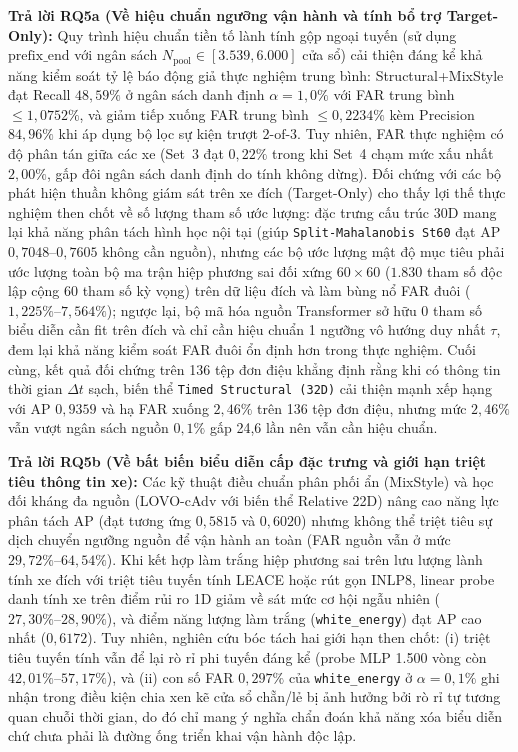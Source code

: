 \documentclass[12pt, a4paper, reqno, oneside]{book}
\DeclareRobustCommand{\code}[1]{\nolinkurl{#1}}
\begin{document}
\textbf{Trả lời RQ5a (Về hiệu chuẩn ngưỡng vận hành và tính bổ trợ Target-Only):}
Quy trình hiệu chuẩn tiền tố lành tính gộp ngoại tuyến (sử dụng $\mathrm{prefix\_end}$ với ngân sách $N_{\text{pool}} \in [3.539, 6.000]$ cửa sổ) cải thiện đáng kể khả năng kiểm soát tỷ lệ báo động giả thực nghiệm trung bình: Structural+MixStyle đạt Recall $48{,}59\%$ ở ngân sách danh định $\alpha=1{,}0\%$ với FAR trung bình $\le 1{,}0752\%$, và giảm tiếp xuống FAR trung bình $\le 0{,}2234\%$ kèm Precision $84{,}96\%$ khi áp dụng bộ lọc sự kiện trượt $2\text{-of-}3$. Tuy nhiên, FAR thực nghiệm có độ phân tán giữa các xe (Set~3 đạt $0{,}22\%$ trong khi Set~4 chạm mức xấu nhất $2{,}00\%$, gấp đôi ngân sách danh định do tính không dừng). Đối chứng với các bộ phát hiện thuần không giám sát trên xe đích (Target-Only) cho thấy lợi thế thực nghiệm then chốt về số lượng tham số ước lượng: đặc trưng cấu trúc 30D mang lại khả năng phân tách hình học nội tại (giúp \code{Split-Mahalanobis St60} đạt AP $0{,}7048\text{--}0{,}7605$ không cần nguồn), nhưng các bộ ước lượng mật độ mục tiêu phải ước lượng toàn bộ ma trận hiệp phương sai đối xứng $60\times 60$ ($1.830$ tham số độc lập cộng $60$ tham số kỳ vọng) trên dữ liệu đích và làm bùng nổ FAR đuôi ($1{,}225\%\text{--}7{,}564\%$); ngược lại, bộ mã hóa nguồn Transformer sở hữu 0 tham số biểu diễn cần fit trên đích và chỉ cần hiệu chuẩn 1 ngưỡng vô hướng duy nhất $\tau$, đem lại khả năng kiểm soát FAR đuôi ổn định hơn trong thực nghiệm. Cuối cùng, kết quả đối chứng trên 136 tệp đơn điệu khẳng định rằng khi có thông tin thời gian $\Delta t$ sạch, biến thể \code{Timed Structural (32D)} cải thiện mạnh xếp hạng với AP $0{,}9359$ và hạ FAR xuống $2{,}46\%$ trên 136 tệp đơn điệu, nhưng mức $2{,}46\%$ vẫn vượt ngân sách nguồn $0{,}1\%$ gấp 24,6 lần nên vẫn cần hiệu chuẩn.

\textbf{Trả lời RQ5b (Về bất biến biểu diễn cấp đặc trưng và giới hạn triệt tiêu thông tin xe):}
Các kỹ thuật điều chuẩn phân phối ẩn (MixStyle) và học đối kháng đa nguồn (LOVO-cAdv với biến thể Relative 22D) nâng cao năng lực phân tách AP (đạt tương ứng $0{,}5815$ và $0{,}6020$) nhưng không thể triệt tiêu sự dịch chuyển ngưỡng nguồn để vận hành an toàn (FAR nguồn vẫn ở mức $29{,}72\%\text{--}64{,}54\%$). Khi kết hợp làm trắng hiệp phương sai trên lưu lượng lành tính xe đích với triệt tiêu tuyến tính LEACE hoặc rút gọn INLP8, linear probe danh tính xe trên điểm rủi ro 1D giảm về sát mức cơ hội ngẫu nhiên ($27{,}30\%\text{--}28{,}90\%$), và điểm năng lượng làm trắng (\code{white\_energy}) đạt AP cao nhất ($0{,}6172$). Tuy nhiên, nghiên cứu bóc tách hai giới hạn then chốt: (i) triệt tiêu tuyến tính vẫn để lại rò rỉ phi tuyến đáng kể (probe MLP 1.500 vòng còn $42{,}01\%\text{--}57{,}17\%$), và (ii) con số FAR $0{,}297\%$ của \code{white\_energy} ở $\alpha=0{,}1\%$ ghi nhận trong điều kiện chia xen kẽ cửa sổ chẵn/lẻ bị ảnh hưởng bởi rò rỉ tự tương quan chuỗi thời gian, do đó chỉ mang ý nghĩa chẩn đoán khả năng xóa biểu diễn chứ chưa phải là đường ống triển khai vận hành độc lập.
\end{document}
